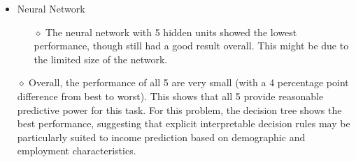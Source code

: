 \documentclass[12pt,letterpaper]{article}
\begin{document}
\begin{itemize}
\begin{itemize}
\begin{itemize}
            \end{itemize}
          \end{itemize}
          \begin{itemize}
            \item Neural Network
            \begin{itemize}
                \item[$\diamond$] The neural network with 5 hidden units showed the lowest performance, though still had a good result overall. This might be due to the limited size of the network. 
            \end{itemize}
          \end{itemize}
          \begin{itemize}
            \item [$\diamond$] Overall, the performance of all 5 are very small (with a 4 percentage point difference from best to worst). This shows that all 5 provide reasonable predictive power for this task. For this problem, the decision tree shows the best performance, suggesting that explicit interpretable decision rules may be particularly suited to income prediction based on demographic and employment characteristics. 
            \end{itemize}
    \end{itemize}
\end{document}
